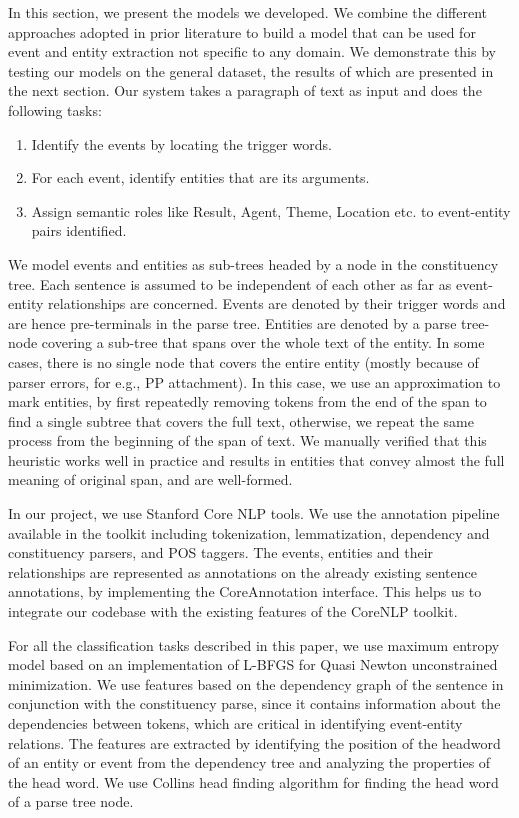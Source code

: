 In this section, we present the models we developed. We combine the different approaches adopted in prior literature to build a model that can be used for event and entity extraction not specific to any domain. We demonstrate this by testing our models on the general dataset, the results of which are presented in the next section. Our system takes a paragraph of text as input and does the following tasks:

\begin{enumerate}
\item Identify the events by locating the trigger words.
\item For each event, identify entities that are its arguments.
\item Assign semantic roles like Result, Agent, Theme, Location etc. to event-entity pairs identified.
\end{enumerate}

We model events and entities as sub-trees headed by a node in the constituency tree. Each sentence is assumed to be independent of each other as far as event-entity relationships are concerned. Events are denoted by their trigger words and are hence pre-terminals in the parse tree. Entities are denoted by a parse tree-node covering a sub-tree that spans over the whole text of the entity. In some cases, there is no single node that covers the entire entity (mostly because of parser errors, for e.g., PP attachment). In this case, we use an approximation to mark entities, by first repeatedly removing tokens from the end of the span to find a single subtree that covers the full text, otherwise, we repeat the same process from the beginning of the span of text. We manually verified that this heuristic works well in practice and results in entities that convey almost the full meaning of original span, and are well-formed.

In our project, we use Stanford Core NLP tools. We use the annotation pipeline available in the toolkit including tokenization, lemmatization, dependency and constituency parsers, and POS taggers. The events, entities and their relationships are represented as annotations on the already existing sentence annotations, by implementing the CoreAnnotation interface. This helps us to integrate our codebase with the existing features of the CoreNLP toolkit.

For all the classification tasks described in this paper, we use maximum entropy model based on an implementation of L-BFGS for Quasi Newton unconstrained minimization. We use features based on the dependency graph of the sentence in conjunction with the constituency parse, since it contains information about the dependencies between tokens, which are critical in identifying event-entity relations. The features are extracted by identifying the position of the headword of an entity or event from the dependency tree and analyzing the properties of the head word. We use Collins head finding algorithm for finding the head word of a parse tree node. 

